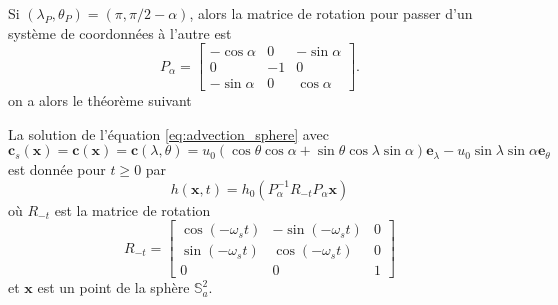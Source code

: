 Si $(\lambda_P, \theta_P) = (\pi, \pi / 2 - \alpha)$, alors la matrice de rotation pour passer d'un système de coordonnées à l'autre est
\begin{equation}
P_{\alpha} = \begin{bmatrix}
- \cos \alpha & 0 & - \sin \alpha \\
0 & -1 & 0 \\
- \sin \alpha & 0 & \cos \alpha
\end{bmatrix} .
\end{equation}
on a alors le théorème suivant

\begin{theoreme}
La solution de l'équation \eqref{eq:advection_sphere} avec
\begin{equation}
\mathbf{c}_s(\mathbf{x}) = \mathbf{c}(\mathbf{x}) = \mathbf{c}(\lambda, \theta) = u_0 \left( \cos \theta \cos \alpha + \sin \theta \cos \lambda \sin \alpha \right) \mathbf{e}_{\lambda} - u_0 \sin \lambda \sin \alpha \mathbf{e}_{\theta}
\label{eq:rot_solide_1}
\end{equation}
est donnée pour $t \geq 0$ par
\begin{equation}
h(\mathbf{x}, t ) = h_0(P_{\alpha}^{-1}R_{-t}P_{\alpha} \mathbf{x})
\end{equation}
où $R_{-t}$ est la matrice de rotation
\begin{equation}
R_{-t} = \begin{bmatrix}
\cos (- \omega_s t) & - \sin (- \omega_s t) & 0 \\
\sin (- \omega_s t) & \cos (- \omega_s t)   & 0 \\
0 & 0 & 1
\end{bmatrix}
\end{equation}
et $\mathbf{x}$ est un point de la sphère $\mathbb{S}_a^2$.
\end{theoreme}

